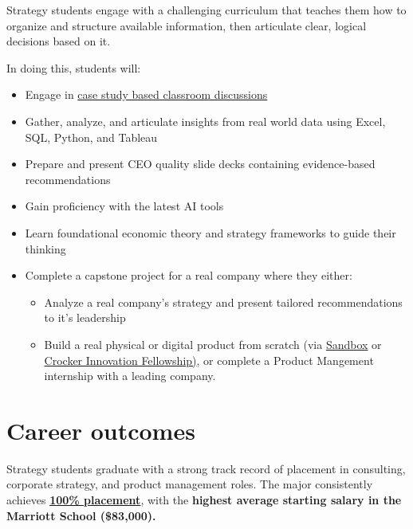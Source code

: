 \documentclass[
  letterpaper,
  DIV=11,
  numbers=noendperiod]{scrreprt}
\begin{document}

Strategy students engage with a challenging curriculum that teaches them
how to organize and structure available information, then articulate
clear, logical decisions based on it.

In doing this, students will:

\begin{itemize}
\item
  Engage in
  \href{https://www.hbs.edu/mba/academic-experience/the-case-method}{case
  study based classroom discussions}
\item
  Gather, analyze, and articulate insights from real world data using
  Excel, SQL, Python, and Tableau
\item
  Prepare and present CEO quality slide decks containing evidence-based
  recommendations
\item
  Gain proficiency with the latest AI tools
\item
  Learn foundational economic theory and strategy frameworks to guide
  their thinking
\item
  Complete a capstone project for a real company where they either:

  \begin{itemize}
  \item
    Analyze a real company's strategy and present tailored
    recommendations to it's leadership
  \item
    Build a real physical or digital product from scratch (via
    \href{https://creators.byu.edu/sandbox/sandbox}{Sandbox} or
    \href{https://crockerinnovationfellows.com/}{Crocker Innovation
    Fellowship)}, or complete a Product Mangement internship with a
    leading company.
  \end{itemize}
\end{itemize}

\section*{Career outcomes}\label{career-outcomes}


Strategy students graduate with a strong track record of placement in
consulting, corporate strategy, and product management roles. The major
consistently achieves
\href{https://byu-my.sharepoint.com/:b:/g/personal/murff_byu_edu/EVe5md0DtNhOrolfnGxg6fQB1F75peFtvGgYqT2rEkYJAg?e=J8Qt0U}{\textbf{100\%
placement}}, with the \textbf{highest average starting salary in the
Marriott School (\$83,000).}
\end{document}
